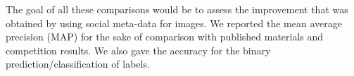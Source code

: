 The goal of all these comparisons would be to assess the improvement that was obtained by using social meta-data for images. We reported the mean average precision (MAP) for the sake of comparison with published materials and competition results. We also gave the accuracy for the binary prediction/classification of labels.


